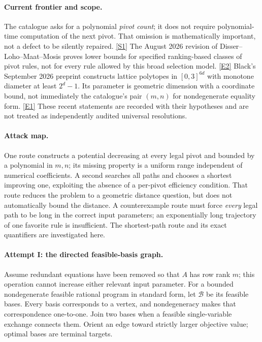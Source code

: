 \documentclass[11pt,a4paper]{article}
\newcommand{\sref}[2]{\hyperlink{source:#1:#2}{[S#2]}}
\newcommand{\eref}[2]{\hyperlink{extra:#1:#2}{[E#2]}}
\numberwithin{equation}{section}
\begin{document}
\paragraph{Current frontier and scope.}
The catalogue asks for a polynomial \emph{pivot count}; it does not
require polynomial-time computation of the next pivot.  That omission
is mathematically important, not a defect to be silently repaired.
\sref{131}{1}  The August 2026 revision of Disser--Loho--Maat--Mosis
proves lower bounds for specified ranking-based classes of pivot rules,
not for every rule allowed by this broad selection model.
\eref{131}{2}  Black's September 2026 preprint constructs lattice
polytopes in $[0,3]^{6d}$ with monotone diameter at least $2^d-1$.
Its parameter is geometric dimension with a coordinate bound, not
immediately the catalogue's pair $(m,n)$ for nondegenerate equality
form. \eref{131}{1}  These recent statements are recorded with their
hypotheses and are not treated as independently audited universal
resolutions.

\paragraph{Attack map.}
One route constructs a potential decreasing at every legal pivot and
bounded by a polynomial in $m,n$; its missing property is a uniform
range independent of numerical coefficients.  A second searches all
paths and chooses a shortest improving one, exploiting the absence
of a per-pivot efficiency condition.  That route reduces the problem
to a geometric distance question, but does not automatically bound the
distance.  A counterexample route must force \emph{every} legal path
to be long in the correct input parameters; an exponentially long
trajectory of one favorite rule is insufficient.  The shortest-path
route and its exact quantifiers are investigated here.

\paragraph{Attempt I: the directed feasible-basis graph.}
Assume redundant equations have been removed so that $A$ has row rank
$m$; this operation cannot increase either relevant input parameter.
For a bounded nondegenerate feasible rational program in standard form,
let $\mathcal B$ be its feasible bases.  Every basis corresponds to a
vertex, and nondegeneracy makes that correspondence one-to-one.  Join
two bases when a feasible single-variable exchange connects them.
Orient an edge toward strictly larger objective value; optimal bases
are terminal targets.
\end{document}
